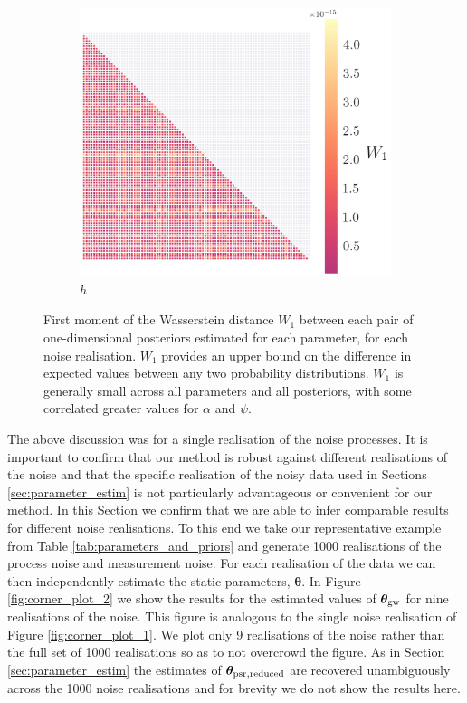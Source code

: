 \documentclass[fleqn,usenatbib,useAMS]{mnras}
\begin{document}
\begin{figure}
\begin{subfigure}[b]{0.3\textwidth}
		\includegraphics[width=\textwidth]{images/WD_6}
		\caption{$h$}
	\end{subfigure}
	\caption{First moment of the Wasserstein distance $W_1$ between each pair of one-dimensional posteriors estimated for each parameter, for each noise realisation. $W_1$ provides an upper bound on the difference in expected values between any two probability distributions. $W_1$ is generally small across all parameters and all posteriors, with some correlated greater values for $\alpha$ and $\psi$.}\label{fig:pairwise_wasserstein}
\end{figure}

The above discussion was for a single realisation of the noise processes. It is important to confirm that our method is robust against different realisations of the noise and that the specific realisation of the noisy data used in Sections \ref{sec:parameter_estim} is not particularly advantageous or convenient for our method. In this Section we confirm that we are able to infer comparable results for different noise realisations. To this end we take our representative example from Table \ref{tab:parameters_and_priors} and generate 1000 realisations of the process noise and measurement noise. For each realisation of the data we can then independently estimate the static parameters, $\boldsymbol{\theta}$. In Figure \ref{fig:corner_plot_2} we show the results for the  estimated values of $\boldsymbol{\theta}_{\rm gw}$ for nine realisations of the noise. This figure is analogous to the single noise realisation of Figure \ref{fig:corner_plot_1}. We plot only 9 realisations of the noise rather than the full set of 1000 realisations so as to not overcrowd the figure. As in Section \ref{sec:parameter_estim} the estimates of $\boldsymbol{\theta}_{\rm psr, reduced}$ are recovered unambiguously across the 1000 noise realisations and for brevity we do not show the results here. \newline 
\end{document}
